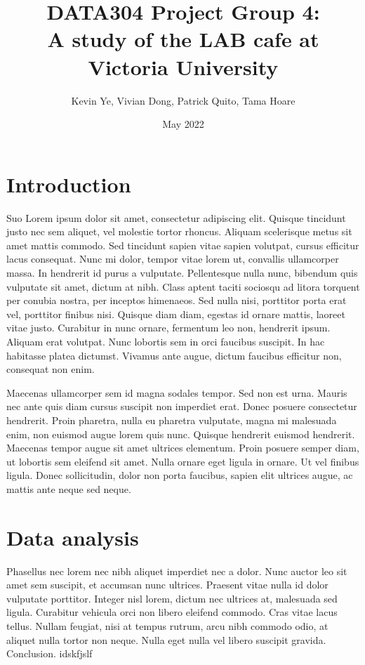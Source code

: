 \documentclass{article}
\title{\Huge DATA304 Project Group 4:\\
  \Huge A study of the LAB cafe at Victoria University}
\author{\Large Kevin Ye, Vivian Dong, Patrick Quito, Tama Hoare }
\date{\Large May 2022}
\begin{document}
\maketitle
\newpage

\section{Introduction}
Suo Lorem ipsum dolor sit amet, consectetur adipiscing elit. Quisque tincidunt justo nec sem aliquet, vel molestie tortor rhoncus. Aliquam scelerisque metus sit amet mattis commodo. Sed tincidunt sapien vitae sapien volutpat, cursus efficitur lacus consequat. Nunc mi dolor, tempor vitae lorem ut, convallis ullamcorper massa. In hendrerit id purus a vulputate. Pellentesque nulla nunc, bibendum quis vulputate sit amet, dictum at nibh. Class aptent taciti sociosqu ad litora torquent per conubia nostra, per inceptos himenaeos. Sed nulla nisi, porttitor porta erat vel, porttitor finibus nisi. Quisque diam diam, egestas id ornare mattis, laoreet vitae justo. Curabitur in nunc ornare, fermentum leo non, hendrerit ipsum. Aliquam erat volutpat. Nunc lobortis sem in orci faucibus suscipit. In hac habitasse platea dictumst. Vivamus ante augue, dictum faucibus efficitur non, consequat non enim.


\noindent Maecenas ullamcorper sem id magna sodales tempor. Sed non est urna. Mauris nec ante quis diam cursus suscipit non imperdiet erat. Donec posuere consectetur hendrerit. Proin pharetra, nulla eu pharetra vulputate, magna mi malesuada enim, non euismod augue lorem quis nunc. Quisque hendrerit euismod hendrerit. Maecenas tempor augue sit amet ultrices elementum. Proin posuere semper diam, ut lobortis sem eleifend sit amet. Nulla ornare eget ligula in ornare. Ut vel finibus ligula. Donec sollicitudin, dolor non porta faucibus, sapien elit ultrices augue, ac mattis ante neque sed neque.

\section{Data analysis}
Phasellus nec lorem nec nibh aliquet imperdiet nec a dolor. Nunc auctor leo sit amet sem suscipit, et accumsan nunc ultrices. Praesent vitae nulla id dolor vulputate porttitor. Integer nisl lorem, dictum nec ultrices at, malesuada sed ligula. Curabitur vehicula orci non libero eleifend commodo. Cras vitae lacus tellus. Nullam feugiat, nisi at tempus rutrum, arcu nibh commodo odio, at aliquet nulla tortor non neque. Nulla eget nulla vel libero suscipit gravida. Conclusion. idskfjslf
\end{document}
